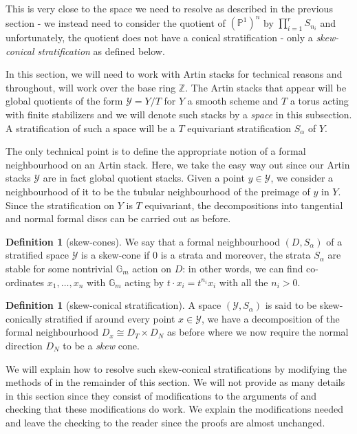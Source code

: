 \documentclass[10pt]{article}
\theoremstyle{plain}
\theoremstyle{definition}
\newtheorem{definition}[theorem]{Definition}
\numberwithin{equation}{section}
\begin{document}
This is very close to the space we need to resolve as described in the previous section - we instead need to consider the quotient of $(\mathbb P^1)^n$ by $\prod_{i=1}^r S_{n_i}$ and unfortunately, the quotient does not have a conical stratification - only a \emph{skew-conical stratification} as defined below.

In this section, we will need to work with Artin stacks for technical reasons and throughout, will work over the base ring $\mathbb Z$. The Artin stacks that appear will be global quotients of the form $\mathscr Y = Y/T$ for $Y$ a smooth scheme and $T$ a torus acting with finite stabilizers and we will denote such stacks by a \emph{space} in this subsection. A stratification of such a space will be a $T$ equivariant stratification $S_\alpha$ of $Y$.

The only technical point is to define the appropriate notion of a formal neighbourhood on an Artin stack. Here, we take the easy way out since our Artin stacks $\mathscr Y$ are in fact global quotient stacks. Given a point $y \in \mathscr Y$, we consider a neighbourhood of it to be the tubular neighbourhood of the preimage of $y$ in $Y$. Since the stratification on $Y$ is $T$ equivariant, the decompositions into tangential and normal formal discs can be carried out as before.


\begin{definition}[skew-cones]
    We say that a formal neighbourhood $(D,S_\alpha)$ of a stratified space $\mathscr Y$ is a skew-cone if $0$ is a strata and moreover, the strata $S_\alpha$ are stable for some nontrivial $\mathbb G_m$ action on $D$: in other words, we can find co-ordinates $x_1,\dots,x_n$ with $\mathbb G_m$ acting by $t \cdot x_i = t^{n_i}x_i$ with all the $n_i > 0$.
\end{definition}

\begin{definition}[skew-conical stratification]
    A space $(\mathcal Y,S_\alpha)$ is said to be skew-conically stratified if around every point $x \in \mathcal Y$, we have a decomposition of the formal neighbourhood $D_x \cong D_T \times D_N$ as before where we now require the normal direction $D_N$ to be a \emph{skew} cone.
\end{definition}

We will explain how to resolve such skew-conical stratifications by modifying the methods of \cite{macpherson1998making} in the remainder of this section. We will not provide as many details in this section since they consist of modifications to the arguments of \cite{macpherson1998making} and checking that these modifications do work. We explain the modifications needed and leave the checking to the reader since the proofs are almost unchanged.
\end{document}
